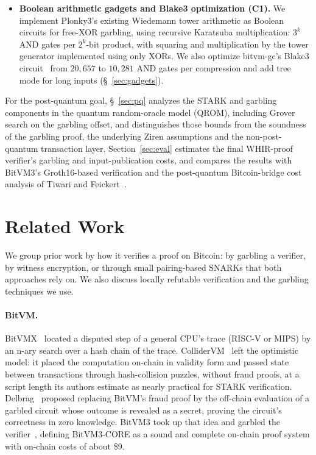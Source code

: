 \documentclass[11pt]{article}
\newcommand{\AND}{\textsf{AND}}
\newcommand{\XOR}{\textsf{XOR}}
\begin{document}
\begin{itemize}
    openings; correctness relies on Ziren's execution recorder, which emits
    the fixed straight-line program that we compile
    (\S~\ref{sec:tape}, \S~\ref{sec:eval}).
  \item \textbf{Boolean arithmetic gadgets and Blake3 optimization (C1).}
    We implement Plonky3's existing Wiedemann tower arithmetic as Boolean
    circuits for free-XOR garbling, using recursive Karatsuba multiplication:
    $3^k$ \AND{} gates per $2^k$-bit product, with squaring and multiplication
    by the tower generator implemented using only \XOR{}s. We also optimize
    bitvm-gc's Blake3 circuit~\cite{bitvmgc} from $20{,}657$ to $10{,}281$ \AND{} gates per
    compression and add tree mode for long inputs
    (\S~\ref{sec:gadgets}).
\end{itemize}
For the post-quantum goal, \S~\ref{sec:pq} analyzes the STARK and garbling components in
the quantum random-oracle model (QROM), including Grover search on the garbling
offset, and distinguishes those bounds from the soundness of the garbling proof,
the underlying Ziren assumptions and the non-post-quantum transaction layer.
Section~\ref{sec:eval} estimates the final WHIR-proof verifier's
garbling and input-publication costs, and compares the
results with BitVM3's Groth16-based verification and the post-quantum
Bitcoin-bridge cost analysis of Tiwari and Feickert~\cite{tf26pq}.

\section{Related Work}\label{sec:related}

We group prior work by how it verifies a proof on Bitcoin: by garbling a verifier,
by witness encryption, or through small pairing-based SNARKs that both approaches
rely on. We also discuss locally refutable verification and the garbling techniques we use.

\paragraph{BitVM.} BitVMX~\cite{bitvmx24} located a disputed
step of a general CPU's trace (RISC-V or MIPS) by an n-ary search over a hash
chain of the trace. ColliderVM~\cite{collidervm25} left the optimistic model: it
placed the computation on-chain in validity form and passed state between
transactions through hash-collision puzzles, without fraud proofs, at a script
length its authors estimate as nearly practical for STARK verification.
Delbrag~\cite{delbrag25} proposed replacing BitVM's fraud proof by the
off-chain evaluation of a garbled circuit whose outcome is revealed as a
secret, proving the circuit's correctness in zero knowledge. BitVM3 took up that idea and
garbled the verifier~\cite{bitvm3paper,che25sok}, defining BitVM3-CORE as a
sound and complete on-chain proof system with on-chain costs of about \$9.
\end{document}
